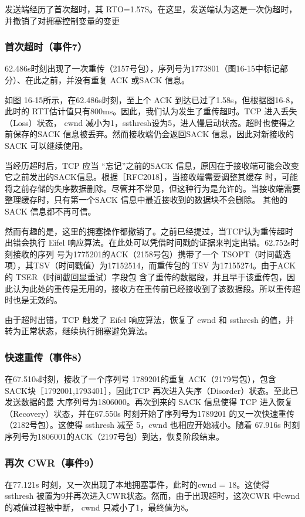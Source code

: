 发送端经历了首次超时，其 RTO=1.57S。在这里，发送端认为这是一次伪超时，并撤销了对拥塞控制变量的变更

\subsubsection{首次超时（事件7）}
62.486s时刻出现了一次重传（2157号包），序列号为1773801（图16-15中标记部分）、在此之前，并没有重复 ACK 或SACK 信息。

如图 16-15所示，在62.486s时刻，至上个 ACK 到达已过了1.58s，但根据图16-8，此时的 RTT估计值只有800ms。因此，我们认为发生了重传超时。TCP 进入丢失（Loss）状态，
cwnd 减小为1，ssthresh设为5，进人慢启动状态。超时也使得之前保存的SACK 信息被丢弃。然而接收端仍会返回SACK 信息，因此对新接收的 SACK 可以继续使用。

\begin{tcolorbox}
    当经历超时后，TCP 应当 “忘记”之前的SACK 信息，原因在于接收端可能会改变它之前发出的SACK信息。根据［RFC2018］，当接收端需要调整其缓存
    时，可能将之前存储的失序数据删除。尽管并不常见，但这种行为是允许的。当接收端需要整理缓存时，只有第一个SACK 信息中最近接收到的数据块不会删除。
    其他的 SACK 信息都不再可信。
\end{tcolorbox}

然而有趣的是，这里的拥塞操作都撤销了。之前已经提过，当TCP认为重传超时出错会执行 Eifel 响应算法。在此处可以凭借时间戳的证据来判定出错。62.752s时刻接收的序列
号为1775201的ACK（2158号包）携带了一个 TSOPT（时间截选项），其TSV（时间戳值）为17152514，而重传包的 TSV 为17155274。由于ACK 的 TSER（时间截回显重试）字段包
含了重传的数据段，并且早于该重传包，因此认为此处的重传是无用的，接收方在重传前已经接收到了该数据段。所以重传超时也是无效的。

由于超时出错，TCP 触发了 Eifel 响应算法，恢复了 cwnd 和 ssthresh 的值，并转为正常状态，继续执行拥塞避免算法。

\subsubsection{快速重传（事件8）}
在67.510s时刻，接收了一个序列号 1789201的重复 ACK（2179号包），包含 SACK块［1792001,1793401］，因此TCP 再次进入失序（Disorder）状态。至此已发送数据的最
大序列号为1806000。再次到来的 SACK 信息使得 TCP 进入恢复（Recovery）状态，并在67.550s 时刻开始了序列号为1789201 的又一次快速重传（2182号包）。这使得 ssthresh 减至
5，cwnd 也相应开始减小。随着 67.916s 时刻序列号为1806001的ACK（2197号包）到达，恢复阶段结束。

\subsubsection{再次 CWR（事件9）}
在77.121s 时刻，又一次出现了本地拥塞事件，此时的cwnd = 18。这使得 ssthresh 被置为9并再次进入CWR状态。然而，由于出现超时，这次CWR 中cwnd 的减值过程被中断，
cwnd 只减小了1，最终值为8。

